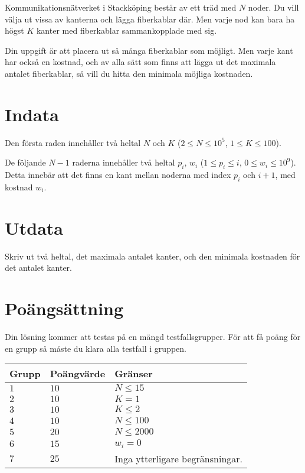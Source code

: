 
Kommunikationsnätverket i Stackköping består av ett träd med $N$ noder. Du vill välja ut vissa av
kanterna och lägga fiberkablar där. Men varje nod kan bara ha högst $K$ kanter med fiberkablar 
sammankopplade med sig. 

Din uppgift är att placera ut så många fiberkablar som möjligt. Men varje kant har också en kostnad,
och av alla sätt som finns att lägga ut det maximala antalet fiberkablar, så vill du hitta den
minimala möjliga kostnaden.

\section*{Indata}

Den första raden innehåller två heltal $N$ och $K$ ($2 \leq N \leq 10^5$, $1 \leq K \leq 100$).

De följande $N-1$ raderna innehåller två heltal $p_i$, $w_i$ ($1 \leq p_i \leq i$, $0 \leq w_i \leq 10^9$).
Detta innebär att det finns en kant mellan noderna med index $p_i$ och $i+1$, med kostnad $w_i$. 

\section*{Utdata}
Skriv ut två heltal, det maximala antalet kanter, och den minimala kostnaden för det antalet kanter.

\section*{Poängsättning}
Din lösning kommer att testas på en mängd testfallsgrupper.
För att få poäng för en grupp så måste du klara alla testfall i gruppen.

\noindent
\begin{tabular}{| l | l | p{12cm} |}
  \hline
  Grupp & Poängvärde & Gränser \\ \hline
  $1$   & $10$       & $N \leq 15$\\ \hline
  $2$   & $10$       & $K = 1$  \\ \hline
  $3$   & $10$       & $K \leq 2$ \\ \hline
  $4$   & $10$       & $N \leq 100$ \\ \hline
  $5$   & $20$       & $N \leq 2000$ \\ \hline
  $6$   & $15$       & $w_i = 0$ \\ \hline
  $7$   & $25$       & Inga ytterligare begränsningar. \\ \hline
\end{tabular}
